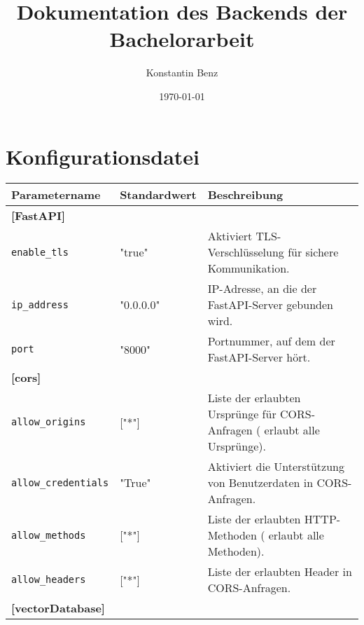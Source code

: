 \documentclass[%
	paper=a4,           %
	12pt,               %
	parskip=full,       %
	oneside,            %
	listof=totoc,		%
	bibliography=totoc,
	toc=listof,
	toc=chapterentrydotfill %
]{scrreprt}             %
\title{Dokumentation des Backends der Bachelorarbeit}
\author{Konstantin Benz}
\date{\today}
\newcommand{\textg}[1]{\glqq {#1}\grqq{}}
\begin{document}
\maketitle
\section*{Konfigurationsdatei}

\begin{table}[H]
    \centering
    \footnotesize
    \begin{tabular}{p{3.5cm}p{2.5cm}p{10.5cm}}
        \toprule
        \textbf{Parametername}           & \textbf{Standardwert} & \textbf{Beschreibung}                                                               \\
        \midrule
        \multicolumn{3}{l}{\textbf{[FastAPI]}}                                                                                                         \\
        \texttt{enable\_tls}             & "true"                & Aktiviert TLS-Verschlüsselung für sichere Kommunikation.                            \\
        \texttt{ip\_address}             & "0.0.0.0"             & IP-Adresse, an die der FastAPI-Server gebunden wird.                                \\
        \texttt{port}                    & "8000"                & Portnummer, auf dem der FastAPI-Server hört.                                        \\
        \midrule
        \multicolumn{3}{l}{\textbf{[cors]}}                                                                                                            \\
        \texttt{allow\_origins}          & ["*"]                 & Liste der erlaubten Ursprünge für CORS-Anfragen (\textg{*} erlaubt alle Ursprünge). \\
        \texttt{allow\_credentials}      & "True"                & Aktiviert die Unterstützung von Benutzerdaten in CORS-Anfragen.                     \\
        \texttt{allow\_methods}          & ["*"]                 & Liste der erlaubten HTTP-Methoden (\textg{*} erlaubt alle Methoden).                \\
        \texttt{allow\_headers}          & ["*"]                 & Liste der erlaubten Header in CORS-Anfragen.                                        \\
        \midrule
        \multicolumn{3}{l}{\textbf{[vectorDatabase]}}                                                                                                  \\

\end{tabular}
\end{table}
\end{document}
